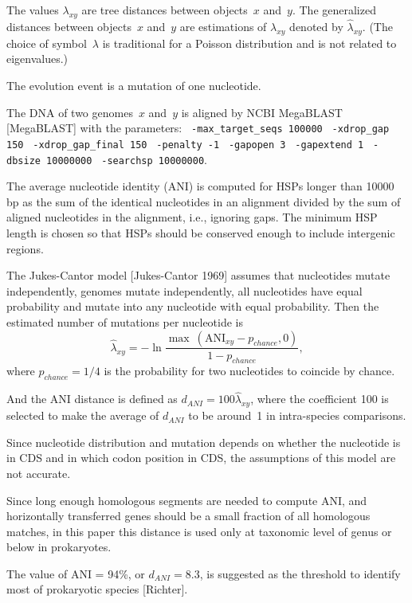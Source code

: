 \documentclass[10pt,a4paper]{article}
\begin{document}
The values $\lambda_{xy}$ are tree distances between objects~$x$ and~$y$.
The generalized distances between objects~$x$ and~$y$ are estimations of $\lambda_{xy}$
denoted by $\hat \lambda_{xy}$.
(The choice of symbol~$\lambda$ is traditional for a Poisson distribution and is not related to eigenvalues.)



The evolution event is a mutation of one nucleotide.

The DNA of two genomes~$x$ and~$y$ is aligned by NCBI MegaBLAST [MegaBLAST] with the parameters:
\verb| -max_target_seqs 100000|
\verb| -xdrop_gap 150|
\verb| -xdrop_gap_final 150|
\verb| -penalty -1|
\verb| -gapopen 3|
\verb| -gapextend 1|
\verb| -dbsize 10000000|
\verb| -searchsp 10000000|.

The average nucleotide identity (ANI) is computed for HSPs longer than 10000 bp as the sum of the identical nucleotides in an alignment divided by the sum of aligned nucleotides in the alignment,
i.e., ignoring gaps.
The minimum HSP length is chosen so that HSPs should be conserved enough to include intergenic regions.

The Jukes-Cantor model [Jukes-Cantor 1969] assumes that nucleotides mutate independently, genomes mutate independently, all nucleotides have equal probability and mutate into any nucleotide with equal probability.
Then the estimated number of mutations per nucleotide is
$$ \hat \lambda_{xy} = - \ln \frac {\max \ (\mathrm{ANI}_{xy} - p_{chance}, 0)} {1 - p_{chance}}, $$
where $p_{chance} = 1/4$ is the probability for two nucleotides to coincide by chance.

And the ANI distance is defined as
$ d_{ANI} = 100 \hat \lambda_{xy}$,
where the coefficient 100 is selected to make the average of $d_{ANI}$ to be around~1 in intra-species comparisons.

Since nucleotide distribution and mutation depends on whether the nucleotide is in CDS and in which codon position in CDS,
the assumptions of this model are not accurate.

Since long enough homologous segments are needed to compute ANI,
and horizontally transferred genes should be a small fraction of all homologous matches,
in this paper this distance is used only at taxonomic level of genus or below in prokaryotes.

The value of ANI = 94\%, or $d_{ANI} = 8.3$, is suggested as the threshold to identify most of prokaryotic species [Richter].
\end{document}
